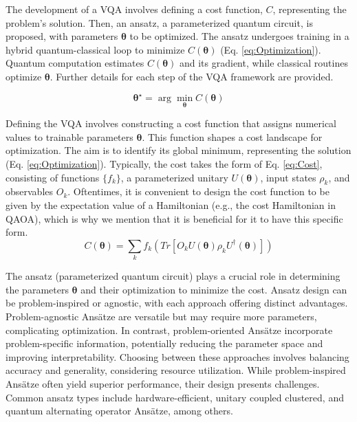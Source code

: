 The development of a VQA involves defining a cost function, \( C \), representing the problem's solution. Then, an ansatz, a parameterized quantum circuit, is proposed, with parameters \(\boldsymbol{\theta}\) to be optimized. The ansatz undergoes training in a hybrid quantum-classical loop to minimize \( C(\boldsymbol{\theta}) \) (Eq. \ref{eq:Optimization}). Quantum computation estimates \( C(\boldsymbol{\theta}) \) and its gradient, while classical routines optimize \(\boldsymbol{\theta}\). Further details for each step of the VQA framework are provided.

\begin{equation}\label{eq:Optimization}
\boldsymbol{\theta}^{\star} = \arg \min_{\boldsymbol{\theta}} C(\boldsymbol{\theta})
\end{equation}

 Defining the VQA involves constructing a cost function that assigns numerical values to trainable parameters \(\boldsymbol{\theta}\). This function shapes a cost landscape for optimization. The aim is to identify its global minimum, representing the solution (Eq. \ref{eq:Optimization}). Typically, the cost takes the form of Eq. \ref{eq:Cost}, consisting of functions \(\{f_k\}\), a parameterized unitary \(U(\boldsymbol{\theta})\), input states \(\rho_k\), and observables \(O_k\). Oftentimes, it is convenient to design the cost function to be given by the expectation value of a Hamiltonian (e.g., the cost Hamiltonian in QAOA), which is why we mention that it is beneficial for it to have this specific form.
\begin{equation}\label{eq:Cost}
C(\boldsymbol{\theta}) = \sum_k f_k\left( Tr\left[O_k U(\boldsymbol{\theta}) \rho_k U^{\dagger}(\boldsymbol{\theta})\right] \right)
\end{equation}


 The ansatz (parameterized quantum circuit) plays a crucial role in determining the parameters $\boldsymbol{\theta}$ and their optimization to minimize the cost. Ansatz design can be problem-inspired or agnostic, with each approach offering distinct advantages. Problem-agnostic Ansätze are versatile but may require more parameters, complicating optimization. In contrast, problem-oriented Ansätze incorporate problem-specific information, potentially reducing the parameter space and improving interpretability. Choosing between these approaches involves balancing accuracy and generality, considering resource utilization. While problem-inspired Ansätze often yield superior performance, their design presents challenges. Common ansatz types include hardware-efficient, unitary coupled clustered, and quantum alternating operator Ansätze, among others. \\

